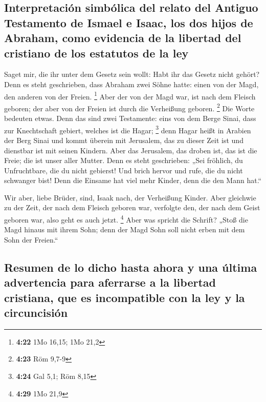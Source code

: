 \hypertarget{interpretaciuxf3n-simbuxf3lica-del-relato-del-antiguo-testamento-de-ismael-e-isaac-los-dos-hijos-de-abraham-como-evidencia-de-la-libertad-del-cristiano-de-los-estatutos-de-la-ley}{%
\subsection{Interpretación simbólica del relato del Antiguo Testamento
de Ismael e Isaac, los dos hijos de Abraham, como evidencia de la
libertad del cristiano de los estatutos de la
ley}\label{interpretaciuxf3n-simbuxf3lica-del-relato-del-antiguo-testamento-de-ismael-e-isaac-los-dos-hijos-de-abraham-como-evidencia-de-la-libertad-del-cristiano-de-los-estatutos-de-la-ley}}

 Saget mir, die ihr unter dem Gesetz sein wollt: Habt ihr
das Gesetz nicht gehört?  Denn es steht geschrieben, dass
Abraham zwei Söhne hatte: einen von der Magd, den anderen von der
Freien. \footnote{\textbf{4:22} 1Mo 16,15; 1Mo 21,2} 
Aber der von der Magd war, ist nach dem Fleisch geboren; der aber von
der Freien ist durch die Verheißung geboren. \footnote{\textbf{4:23} Röm
  9,7-9}  Die Worte bedeuten etwas. Denn das sind zwei
Testamente: eins von dem Berge Sinai, dass zur Knechtschaft gebiert,
welches ist die Hagar; \footnote{\textbf{4:24} Gal 5,1; Röm 8,15}
 denn Hagar heißt in Arabien der Berg Sinai und kommt
überein mit Jerusalem, das zu dieser Zeit ist und dienstbar ist mit
seinen Kindern.  Aber das Jerusalem, das droben ist, das
ist die Freie; die ist unser aller Mutter.  Denn es steht
geschrieben: „Sei fröhlich, du Unfruchtbare, die du nicht gebierst! Und
brich hervor und rufe, die du nicht schwanger bist! Denn die Einsame hat
viel mehr Kinder, denn die den Mann hat.``

 Wir aber, liebe Brüder, sind, Isaak nach, der Verheißung
Kinder.  Aber gleichwie zu der Zeit, der nach dem Fleisch
geboren war, verfolgte den, der nach dem Geist geboren war, also geht es
auch jetzt. \footnote{\textbf{4:29} 1Mo 21,9}  Aber was
spricht die Schrift? „Stoß die Magd hinaus mit ihrem Sohn; denn der Magd
Sohn soll nicht erben mit dem Sohn der Freien.``

\hypertarget{resumen-de-lo-dicho-hasta-ahora-y-una-uxfaltima-advertencia-para-aferrarse-a-la-libertad-cristiana-que-es-incompatible-con-la-ley-y-la-circuncisiuxf3n}{%
\subsection{Resumen de lo dicho hasta ahora y una última advertencia
para aferrarse a la libertad cristiana, que es incompatible con la ley y
la
circuncisión}\label{resumen-de-lo-dicho-hasta-ahora-y-una-uxfaltima-advertencia-para-aferrarse-a-la-libertad-cristiana-que-es-incompatible-con-la-ley-y-la-circuncisiuxf3n}}

